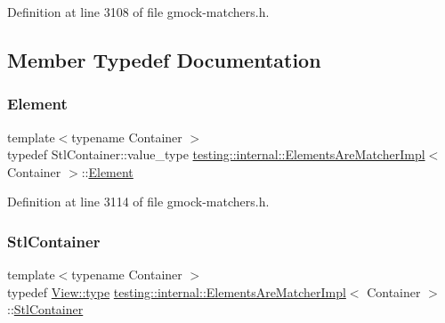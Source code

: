 Definition at line 3108 of file gmock-\/matchers.\+h.



\subsection{Member Typedef Documentation}
\mbox{\label{classtesting_1_1internal_1_1ElementsAreMatcherImpl_ab2ae88256ac950b69cd2af67b9820c87}} 
\subsubsection{\texorpdfstring{Element}{Element}}
{\footnotesize\ttfamily template$<$typename Container $>$ \\
typedef Stl\+Container\+::value\+\_\+type \hyperlink{classtesting_1_1internal_1_1ElementsAreMatcherImpl}{testing\+::internal\+::\+Elements\+Are\+Matcher\+Impl}$<$ Container $>$\+::\hyperlink{classtesting_1_1internal_1_1ElementsAreMatcherImpl_ab2ae88256ac950b69cd2af67b9820c87}{Element}}



Definition at line 3114 of file gmock-\/matchers.\+h.

\mbox{\label{classtesting_1_1internal_1_1ElementsAreMatcherImpl_a5897abb9a1dcf88afe04e14986ebe46f}} 
\subsubsection{\texorpdfstring{Stl\+Container}{StlContainer}}
{\footnotesize\ttfamily template$<$typename Container $>$ \\
typedef \hyperlink{classtesting_1_1internal_1_1StlContainerView_a2b2c63a6dcdbfe63fb0ee121ebf463ba}{View\+::type} \hyperlink{classtesting_1_1internal_1_1ElementsAreMatcherImpl}{testing\+::internal\+::\+Elements\+Are\+Matcher\+Impl}$<$ Container $>$\+::\hyperlink{classtesting_1_1internal_1_1ElementsAreMatcherImpl_a5897abb9a1dcf88afe04e14986ebe46f}{Stl\+Container}}



